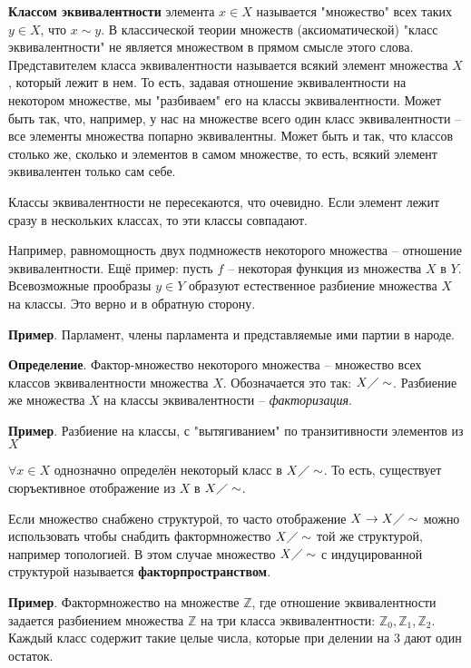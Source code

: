 \documentclass[a4paper]{book}
\begin{document}
\textbf{Классом эквивалентности} элемента $x\in X$ называется "множество" всех таких $y\in X$, что $x\sim y$. В классической теории множеств (аксиоматической) "класс эквивалентности" не является множеством в прямом смысле этого слова. Представителем класса эквивалентности называется всякий элемент множества $X$, который лежит в нем. То есть, задавая отношение эквивалентности на некотором множестве, мы "разбиваем" его на классы эквивалентности. Может быть так, что, например, у нас на множестве всего один класс эквивалентности -- все элементы множества попарно эквивалентны. Может быть и так, что классов столько же, сколько и элементов в самом множестве, то есть, всякий элемент эквивалентен только сам себе. 

Классы эквивалентности не пересекаются, что очевидно. Если элемент лежит сразу в нескольких классах, то эти классы совпадают.

Например, равномощность двух подмножеств некоторого множества -- отношение эквивалентности. Ещё пример: пусть $f$ -- некоторая функция из множества $X$ в $Y$. Всевозможные прообразы $y\in Y$ образуют естественное разбиение множества $X$ на классы. Это верно и в обратную сторону.

\textbf{Пример}. Парламент, члены парламента и представляемые ими партии в народе. 

\textbf{Определение}. Фактор-множество некоторого множества -- множество всех классов эквивалентности множества $X$. Обозначается это так: $X\diagup\sim$. Разбиение же множества $X$ на классы эквивалентности -- \textit{факторизация}. 

\textbf{Пример}. Разбиение на классы, с "вытягиванием" по транзитивности элементов из $X$ 


$\forall x\in X$ однозначно определён некоторый класс в $X\diagup\sim$. То есть, существует сюръективное отображение из $X$ в $X\diagup\sim$. 

Если множество снабжено структурой, то часто отображение $X\rightarrow X\diagup\sim$  можно использовать чтобы снабдить фактормножество  $X\diagup\sim$ той же структурой, например топологией. В этом случае множество $X\diagup\sim$ с индуцированной структурой называется \textbf{факторпространством}.

\textbf{Пример}. Фактормножество на множестве $\mathbb{Z}$, где отношение эквивалентности задается разбиением множества $\mathbb{Z}$ на три класса эквивалентности: $\mathbb{Z}_0, \mathbb{Z}_1, \mathbb{Z}_2$. Каждый класс содержит такие целые числа, которые при делении на $3$ дают один остаток. 
\end{document}
